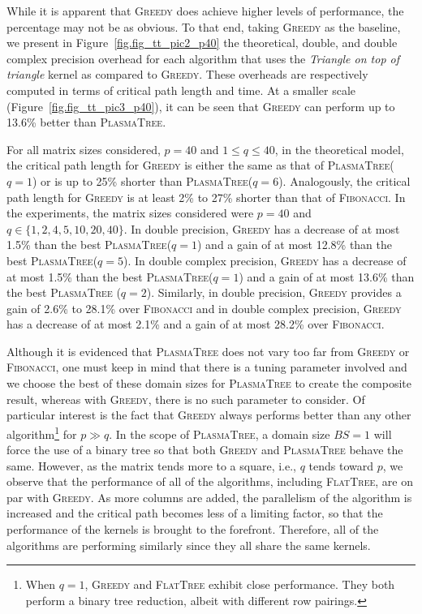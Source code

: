 \documentclass[a4paper,twopages]{article}
\newcommand{\BS}{\ensuremath{\mathit{BS}}\xspace}
\newcommand{\MC}{\textsc{Fibonacci}\xspace}
\newcommand{\Greedy}{\textsc{Greedy}\xspace}
\newcommand{\FT}{\textsc{FlatTree}\xspace}
\newcommand{\PT}{\textsc{PlasmaTree}\xspace}
\begin{document}
While it is apparent that \Greedy does achieve higher levels of performance,
the percentage may not be as obvious.  To that end, taking \Greedy as the
baseline, we present in Figure~\ref{fig.fig_tt_pic2_p40} the theoretical,
double, and double complex precision overhead for each algorithm that uses the
\emph{Triangle on top of triangle} kernel as compared to \Greedy. These
overheads are respectively computed in terms of critical path length and time.
At a smaller scale (Figure~\ref{fig.fig_tt_pic3_p40}), it can be seen that
\Greedy can perform up to 13.6\% better than \PT.

For all matrix sizes considered, $p=40$ and $1 \leq q \leq 40$, in the
theoretical model, the critical path length for \Greedy is either the same as
that of \PT ($q=1$) or is up to 25\% shorter than \PT ($q=6$).  Analogously, the
critical path length for \Greedy is at least 2\% to 27\% shorter than that of
\MC.  In the experiments, the matrix sizes considered were $p=40$ and $q \in \{
1, 2, 4, 5, 10, 20, 40\}$.  In double precision, \Greedy has a decrease of at
most 1.5\% than the best \PT ($q=1$) and a gain of at most 12.8\% than the best
\PT ($q=5$).  In double complex precision, \Greedy has a decrease of at most
1.5\% than the best \PT ($q=1$) and a gain of at most 13.6\% than the best \PT
($q=2$).  Similarly, in double precision, \Greedy provides a gain of 2.6\% to
28.1\% over \MC and in double complex precision, \Greedy has a decrease of at
most 2.1\% and a gain of at most 28.2\% over \MC.

Although it is evidenced that \PT does not vary too far from \Greedy or \MC,
one must keep in mind that there is a tuning parameter involved and we choose
the best of these domain sizes for \PT to create the composite result, whereas
with \Greedy, there is no such parameter to consider.  Of particular interest
is the fact that \Greedy always performs better than any other algorithm\footnote{When $q=1$, \Greedy and \FT exhibit close performance. They
both perform a binary tree reduction, albeit with different row pairings.} for $
p \gg q$. In
the scope of \PT, a domain size $\BS=1$ will force the use of a binary tree so
that both \Greedy and \PT behave the same. However, as the matrix tends more to
a square, i.e., $q$ tends toward $p$, we observe that the performance of all of
the algorithms, including \FT, are on par with \Greedy.  As more columns are
added, the parallelism of the algorithm is increased and the critical path
becomes less of a limiting factor, so that the performance of the kernels is
brought to the forefront.  Therefore, all of the algorithms are performing
similarly since they all share the same kernels.
\end{document}
